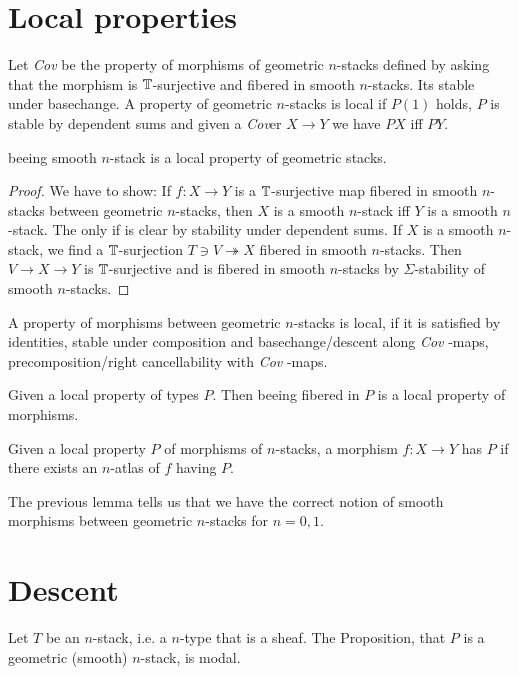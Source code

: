 \documentclass{article}
\newcommand{\Cov}{\emph{Cov} }
\newcommand{\Cover}{\emph{Cov}er }
\begin{document}
\section{Local properties}

\begin{definition}
Let \Cov be the property of morphisms of geometric $n$-stacks defined by asking that the morphism is $\mathbb{T}$-surjective and fibered in smooth $n$-stacks. Its stable under basechange. A property of geometric $n$-stacks is local if $P(1)$ holds, $P$ is stable by dependent sums and given a \Cover  $X \to Y$ we have $P X$ iff $P Y$.
\end{definition}
\begin{example}    
    beeing smooth $n$-stack is a local property of geometric stacks.
\end{example}
\begin{proof}
    We have to show: If $f : X \to Y$ is a $\mathbb{T}$-surjective map fibered in smooth $n$-stacks between geometric $n$-stacks, then $X$ is a smooth $n$-stack iff $Y$ is a smooth $n$-stack.
    The only if is clear by stability under dependent sums.
    If $X$ is a smooth $n$-stack, we find a $\mathbb{T}$-surjection $T \ni V \twoheadrightarrow X$ fibered in smooth $n$-stacks. Then $V \to X \to Y$ is $\mathbb{T}$-surjective and is fibered in smooth $n$-stacks by $\Sigma$-stability of smooth $n$-stacks.
\end{proof}

\begin{definition}
    A property of morphisms between geometric $n$-stacks is local, if it is satisfied by identities, stable under composition and basechange/descent along \Cov-maps, precomposition/right cancellability with \Cov-maps.
\end{definition}
\begin{lemma}
    Given a local property of types $P$. Then beeing fibered in $P$ is a local property of morphisms.
\end{lemma}
\begin{lemma}
    Given a local property $P$ of morphisms of $n$-stacks, a morphism $f : X \to Y$ has $P$ if there exists an $n$-atlas of $f$ having $P$.
\end{lemma}
The previous lemma tells us that we have the correct notion of smooth morphisms between geometric $n$-stacks for $n = 0,1$.
\section{Descent}
 \begin{theorem}{\label{thm:descent}}
     Let $T$ be an $n$-stack, i.e. a $n$-type that is a sheaf. The Proposition, that $P$ is a geometric (smooth) $n$-stack, is modal.
 \end{theorem}
\end{document}

